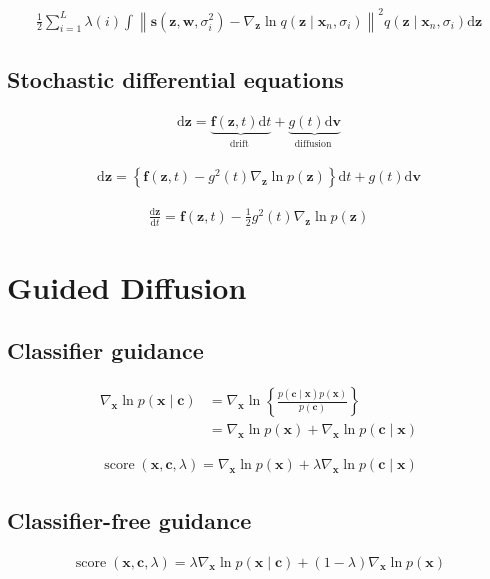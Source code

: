 \documentclass{article}
\begin{document}
\begin{align*}
\frac{1}{2} \sum_{i=1}^{L} \lambda(i) \int\left\|\mathbf{s}\left(\mathbf{z}, \mathbf{w}, \sigma_{i}^{2}\right)-\nabla_{\mathbf{z}} \ln q\left(\mathbf{z} \mid \mathbf{x}_{n}, \sigma_{i}\right)\right\|^{2} q\left(\mathbf{z} \mid \mathbf{x}_{n}, \sigma_{i}\right) \mathrm{d} \mathbf{z} 
\tag{20.54}
\end{align*}

\subsection{Stochastic differential equations}

\begin{align*}
\mathrm{d} \mathbf{z}=\underbrace{\mathbf{f}(\mathbf{z}, t) \mathrm{d} t}_{\text{drift }}+\underbrace{g(t) \mathrm{d} \mathbf{v}}_{\text{diffusion }} 
\tag{20.55}
\end{align*}

\begin{align*}
\mathrm{d} \mathbf{z}=\left\{\mathbf{f}(\mathbf{z}, t)-g^{2}(t) \nabla_{\mathbf{z}} \ln p(\mathbf{z})\right\} \mathrm{d} t+g(t) \mathrm{d} \mathbf{v} 
\tag{20.56}
\end{align*}

\begin{align*}
\frac{\mathrm{d} \mathbf{z}}{\mathrm{d} t}=\mathbf{f}(\mathbf{z}, t)-\frac{1}{2} g^{2}(t) \nabla_{\mathbf{z}} \ln p(\mathbf{z}) 
\tag{20.57}
\end{align*}

\section{Guided Diffusion}

\subsection{Classifier guidance}

\begin{align*}
\nabla_{\mathbf{x}} \ln p(\mathbf{x} \mid \mathbf{c}) & =\nabla_{\mathbf{x}} \ln \left\{\frac{p(\mathbf{c} \mid \mathbf{x}) p(\mathbf{x})}{p(\mathbf{c})}\right\} \\
& =\nabla_{\mathbf{x}} \ln p(\mathbf{x})+\nabla_{\mathbf{x}} \ln p(\mathbf{c} \mid \mathbf{x}) 
\tag{20.58}
\end{align*}

\begin{align*}
\operatorname{score}(\mathbf{x}, \mathbf{c}, \lambda)=\nabla_{\mathbf{x}} \ln p(\mathbf{x})+\lambda \nabla_{\mathbf{x}} \ln p(\mathbf{c} \mid \mathbf{x}) 
\tag{20.59}
\end{align*}

\subsection{Classifier-free guidance}

\begin{align*}
\operatorname{score}(\mathbf{x}, \mathbf{c}, \lambda)=\lambda \nabla_{\mathbf{x}} \ln p(\mathbf{x} \mid \mathbf{c})+(1-\lambda) \nabla_{\mathbf{x}} \ln p(\mathbf{x}) 
\tag{20.60}
\end{align*}
\end{document}
